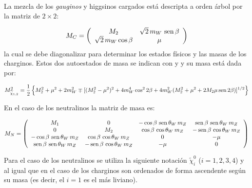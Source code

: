 \begin{itemize}
La mezcla de los \emph{gauginos} y higgsinos cargados está descripta a orden árbol por la matriz de $2\times 2$:

\begin{equation}
  M_{C} = \left(
  \begin{array}{cc}
      M_2               & {\sqrt{2}} \, m_{W} \, \operatorname{sen} \beta  \\
      \sqrt{2} \, m_W \cos \beta  & \mu
  \end{array}
  \right)
\end{equation}
%
la cual se debe diagonalizar para determinar los estados físicos y las masas de los charginos.
Estos dos autoestados de masa se indican con {\chinoonepm} y
{\chinotwopm} y su masa está dada por:

\begin{equation}
  M^2_{\widetilde{\chi}_{1,2}} = \frac{1}{2} \left\{ M_2^2 + \mu^2 + 2 m_W^2 \mp
  [(M_2^2-\mu^2)^2 + 4 m_W^4 \cos^2 2\beta + 4 m_W^2 (M_2^2+\mu^2 + 2 M_2 \mu \operatorname{sen}
    2\beta)]^{1/2} \right\}
\end{equation}


En el caso de los neutralinos la matriz de masa es:

\begin{equation}
  M_{N} = \left(
  \begin{array}{cccc}
    M_1 & 0 & - \cos\beta \, \operatorname{sen}\theta_W \, m_Z & \operatorname{sen}\beta \, \operatorname{sen}\theta_W \, m_Z \\
    0 & M_2 & \cos\beta \, \cos\theta_W \, m_Z & -\operatorname{sen}\beta \, \cos\theta_W \, m_Z \\
    - \cos\beta \, \operatorname{sen}\theta_W \, m_Z & \cos\beta \, \cos\theta_W  \,m_Z & 0 & -\mu \\
    \operatorname{sen}\beta \, \operatorname{sen}\theta_W \, m_Z & -\operatorname{sen}\beta \, \cos\theta_W \, m_Z & -\mu & 0 \\
  \end{array}
  \right)
\end{equation}

Para el caso de los neutralinos se utiliza la siguiente notación $\tilde{\chi}^0_{i}$ ($i=1,2,3,4$)
y al igual que en el caso de los charginos son ordenados de forma ascendente según su masa (es decir,
el $i=1$ es el más liviano).




\end{itemize}
